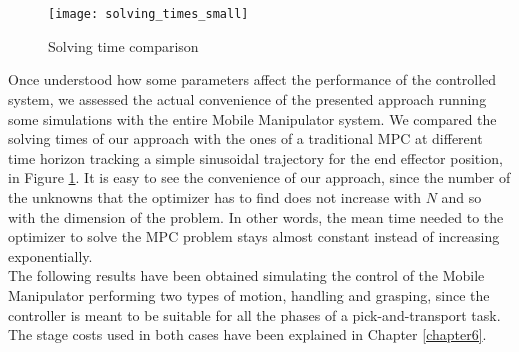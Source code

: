 \\\\
\begin{figure}[h!]
	\centering
	\texttt{[image: solving\_times\_small]}
	\caption{Solving time comparison}
	\label{solving_times}
\end{figure}
Once understood how some parameters affect the performance of the controlled system, we assessed the actual convenience of the presented approach running some simulations with the entire Mobile Manipulator system. We compared the solving times of our approach with the ones of a traditional MPC at different time horizon tracking a simple sinusoidal trajectory for the end effector position, in Figure \ref{solving_times}. It is easy to see the convenience of our approach, since the number of the unknowns that the optimizer has to find does not increase with $N$ and so with the dimension of the problem. In other words, the mean time needed to the optimizer to solve the MPC problem stays almost constant instead of increasing exponentially.\\
The following results have been obtained simulating the control of the Mobile Manipulator performing two types of motion, handling and grasping, since the controller is meant to be suitable for all the phases of a pick-and-transport task. The stage costs used in both cases have been explained in Chapter \ref{chapter6}.
